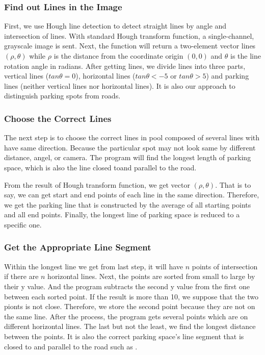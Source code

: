 \documentclass[journal,article,submit,moreauthors,pdftex,10pt,a4paper]{mdpi}
\begin{document}
\subsubsection{Find out Lines in the Image}

First, we use Hough line detection to detect straight lines
by angle and intersection of lines.
With standard Hough transform function, a single-channel, grayscale image is sent.
Next, the function will return a two-element vector lines $(\rho, \theta)$ while $\rho$ is the distance
from the coordinate origin $(0, 0)$ and $\theta$ is the line rotation angle in radians.
After getting lines, we divide lines into three parts, vertical lines ($tan\theta = 0$),
horizontal lines ($tan\theta < -5$ or $tan\theta > 5$) and parking lines
(neither vertical lines nor horizontal lines). It is also our approach to
distinguish parking spots from roads.

\subsubsection{Choose the Correct Lines}

The next step is to choose the correct lines in pool composed of
several lines with have same direction. Because the particular spot
may not look same by different distance, angel, or camera.
The program will find the longest length of parking space, which is
also the line closed toand parallel to the road.

From the result of Hough transform function, we get vector $(\rho, \theta)$.
That is to say, we can get start and end points of each line in the same direction.
Therefore, we get the parking line that is constructed by the
average of all starting points and all end points.
Finally, the longest line of parking space is reduced to a specific one.

\subsubsection{Get the Appropriate Line Segment}

Within the longest line we get from last step, it will have $n$ points of
intersection if there are $n$ horizontal lines. Next, the points are
sorted from small to large by their y value. And the program subtracts
the second y value from the first one between each sorted point. If the
result is more than 10, we suppose that the two pionts is not close.
Therefore, we store the second point because they are not on the same line.
After the process, the program gets several points which are on
different horizontal lines. The last but not the least, we find the longest
distance between the points. It is also the correct parking space's line
segment that is closed to and parallel to the road such as .
\end{document}
